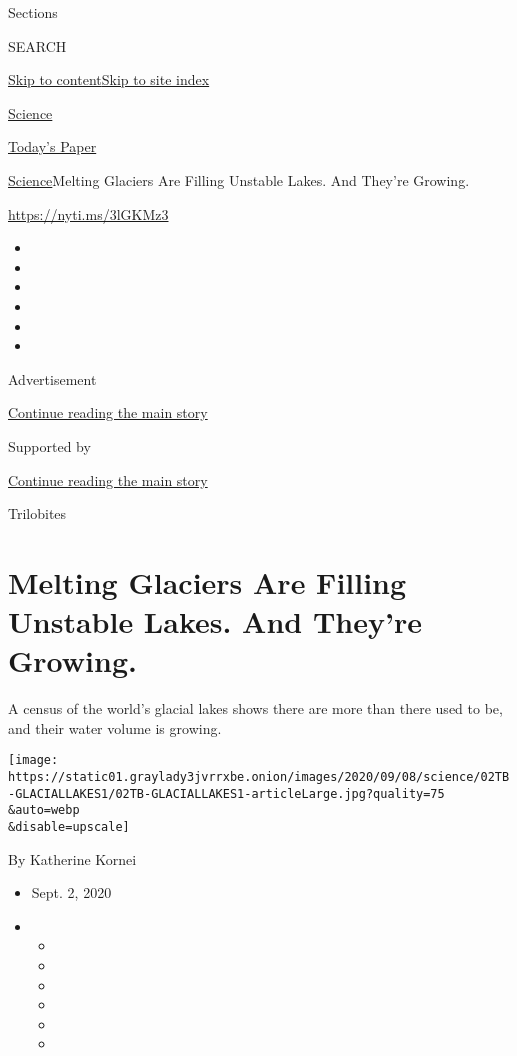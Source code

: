 Sections

SEARCH

\protect\hyperlink{site-content}{Skip to
content}\protect\hyperlink{site-index}{Skip to site index}

\href{https://www.nytimes3xbfgragh.onion/section/science}{Science}

\href{https://myaccount.nytimes3xbfgragh.onion/auth/login?response_type=cookie\&client_id=vi}{}

\href{https://www.nytimes3xbfgragh.onion/section/todayspaper}{Today's
Paper}

\href{/section/science}{Science}\textbar{}Melting Glaciers Are Filling
Unstable Lakes. And They're Growing.

\url{https://nyti.ms/3lGKMz3}

\begin{itemize}
\item
\item
\item
\item
\item
\item
\end{itemize}

Advertisement

\protect\hyperlink{after-top}{Continue reading the main story}

Supported by

\protect\hyperlink{after-sponsor}{Continue reading the main story}

Trilobites

\hypertarget{melting-glaciers-are-filling-unstable-lakes-and-theyre-growing}{%
\section{Melting Glaciers Are Filling Unstable Lakes. And They're
Growing.}\label{melting-glaciers-are-filling-unstable-lakes-and-theyre-growing}}

A census of the world's glacial lakes shows there are more than there
used to be, and their water volume is growing.

\texttt{[image: https://static01.graylady3jvrrxbe.onion/images/2020/09/08/science/02TB-GLACIALLAKES1/02TB-GLACIALLAKES1-articleLarge.jpg?quality=75\\\&auto=webp\\\&disable=upscale]}

By Katherine Kornei

\begin{itemize}
\item
  Sept. 2, 2020
\item
  \begin{itemize}
  \item
  \item
  \item
  \item
  \item
  \item
  \end{itemize}
\end{itemize}


